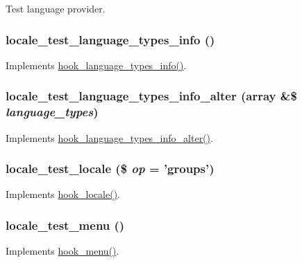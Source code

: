 \label{locale__test_8module_abffb4b9384b6cc1f12d88b25c531cd46}
Test language provider. \hypertarget{locale__test_8module_a3bad268dee9392f2aa9a77a98f074ba6}{
\subsubsection[{locale\_\-test\_\-language\_\-types\_\-info}]{\setlength{\rightskip}{0pt plus 5cm}locale\_\-test\_\-language\_\-types\_\-info ()}}
\label{locale__test_8module_a3bad268dee9392f2aa9a77a98f074ba6}
Implements \hyperlink{group__language__negotiation_ga8932d2167557c18966cd033cfbe0f37e}{hook\_\-language\_\-types\_\-info()}. \hypertarget{locale__test_8module_af9eb4bf83cc7414e4bd35c380328ca55}{
\subsubsection[{locale\_\-test\_\-language\_\-types\_\-info\_\-alter}]{\setlength{\rightskip}{0pt plus 5cm}locale\_\-test\_\-language\_\-types\_\-info\_\-alter (array \&\$ {\em language\_\-types})}}
\label{locale__test_8module_af9eb4bf83cc7414e4bd35c380328ca55}
Implements \hyperlink{group__language__negotiation_ga9752378ca7c389892fea3fb2960263dd}{hook\_\-language\_\-types\_\-info\_\-alter()}. \hypertarget{locale__test_8module_a45396bc87d59d545353c1acb14dbb572}{
\subsubsection[{locale\_\-test\_\-locale}]{\setlength{\rightskip}{0pt plus 5cm}locale\_\-test\_\-locale (\$ {\em op} = {\ttfamily 'groups'})}}
\label{locale__test_8module_a45396bc87d59d545353c1acb14dbb572}
Implements \hyperlink{group__hooks_ga7d8968676deb891e4838c2d3173de7f6}{hook\_\-locale()}. \hypertarget{locale__test_8module_a977b4e50e931e25a7d2c263e97192177}{
\subsubsection[{locale\_\-test\_\-menu}]{\setlength{\rightskip}{0pt plus 5cm}locale\_\-test\_\-menu ()}}
\label{locale__test_8module_a977b4e50e931e25a7d2c263e97192177}
Implements \hyperlink{group__hooks_ga5c95244fea59b25666e409759e133ded}{hook\_\-menu()}.

